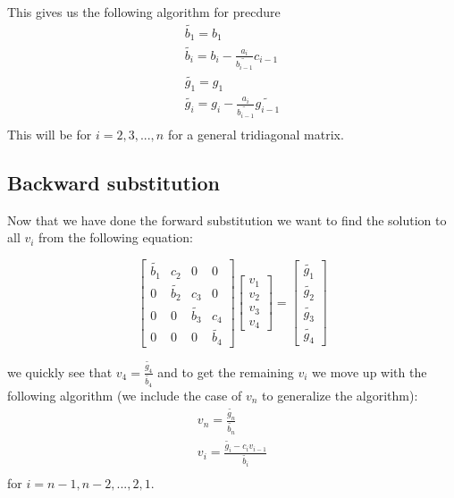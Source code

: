 \documentclass[english,notitlepage]{article}  %
\begin{document}
    This gives us the following algorithm for precdure
    \begin{gather}\label{eq:for}
        \tilde{b_1} = b_1 \\
        \tilde{b_i} = b_i - \frac{a_i}{\tilde{b_{i-1}}}c_{i-1}\\\label{line:for_b}
        \tilde{g_1} = g_1 \\
        \tilde{g_i} = g_i - \frac{a_i}{\tilde{b_{i-1}}}\tilde{g_{i-1}}\\\label{line:for_g}
    \end{gather}
    This will be for $i = 2, 3, ..., n$ for a general tridiagonal matrix.

  \subsection*{Backward substitution}\label{sec:backward}

    Now that we have done the forward substitution we want to find the solution to all $v_i$ from the following equation:

    \begin{equation}
        \begin{bmatrix}
            \tilde{b_1} & c_2 & 0 & 0 \\
            0 & \tilde{b_2} & c_3 & 0 \\
            0 & 0 & \tilde{b_3} & c_4 \\
            0 & 0 & 0 & \tilde{b_4}
        \end{bmatrix} \begin{bmatrix}
            v_1\\
            v_2\\
            v_3\\
            v_4
        \end{bmatrix} = \begin{bmatrix}
            \tilde{g_1}\\
            \tilde{g_2}\\
            \tilde{g_3}\\
            \tilde{g_4}
        \end{bmatrix}
    \end{equation}

    we quickly see that $v_4 = \frac{\tilde{g_4}}{\tilde{b_4}}$ and to get the remaining $v_i$ we move up with the following algorithm (we include the case of $v_n$ to generalize the algorithm):
    \begin{gather}\label{eq:back}
        v_n = \frac{\tilde{g_n}}{\tilde{b_n}}\\
        v_i = \frac{\tilde{g_i} - c_iv_{i-1}}{\tilde{b_i}}\\
    \end{gather}
    for $i = n-1, n-2, ..., 2, 1$.
\end{document}
